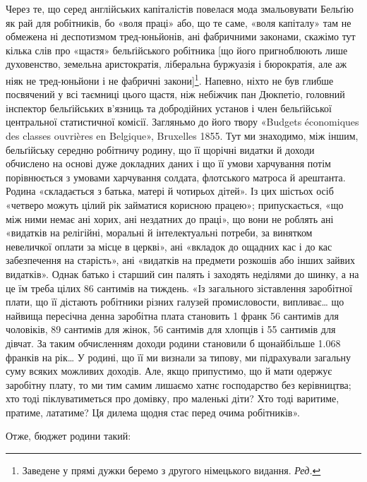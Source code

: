 
Через те, що серед англійських капіталістів повелася мода
змальовувати Бельґію як рай для робітників, бо «воля праці»
або, що те саме, «воля капіталу» там не обмежена ні деспотизмом
тред-юньйонів, ані фабричними законами, скажімо тут кілька
слів про «щастя» бельґійського робітника [що його пригноблюють
лише духовенство, земельна аристократія, ліберальна буржуазія
і бюрократія, але аж ніяк не тред-юньйони і не фабричні закони]\footnote*{
Заведене у прямі дужки беремо з другого німецького видання. \emph{Ред.}
}.
Напевно, ніхто не був глибше посвячений у всі таємниці
цього щастя, ніж небіжчик пан Дюкпетіо, головний інспектор
бельґійських в’язниць та добродійних установ і член бельґійської
центральної статистичної комісії. Загляньмо до його твору
«Budgets économiques des classes ouvrières en Belgique», Bruxelles
1855. Тут ми знаходимо, між іншим, бельґійську середню
робітничу родину, що її щорічні видатки й доходи обчислено
на основі дуже докладних даних і що її умови харчування потім
порівнюється з умовами харчування солдата, флотського матроса
й арештанта. Родина «складається з батька, матері й чотирьох
дітей». Із цих шістьох осіб «четверо можуть цілий рік займатися
корисною працею»; припускається, «що між ними немає ані
хорих, ані нездатних до праці», що вони не роблять ані «видатків
на релігійні, моральні й інтелектуальні потреби, за винятком
невеличкої оплати за місце в церкві», ані «вкладок до ощадних
кас і до кас забезпечення на старість», ані «видатків на предмети
розкошів або інших зайвих видатків». Однак батько і старший
син палять і заходять неділями до шинку, а на це їм треба цілих
86 сантимів на тиждень. «Із загального зіставлення заробітної
плати, що її дістають робітники різних галузей промисловости,
випливає\dots{} що найвища пересічна денна заробітна плата становить
1 франк 56 сантимів для чоловіків, 89 сантимів для жінок,
56 сантимів для хлопців і 55 сантимів для дівчат. За таким обчисленням
доходи родини становили б щонайбільше \num{1.068} франків
на рік\dots{} У родині, що її ми визнали за типову, ми підрахували
загальну суму всяких можливих доходів. Але, якщо припустимо,
що й мати одержує заробітну плату, то ми тим самим
лишаємо хатнє господарство без керівництва; хто тоді піклуватиметься
про домівку, про маленькі діти? Хто тоді варитиме, пратиме,
лататиме? Ця дилема щодня стає перед очима робітників».

Отже, бюджет родини такий:

